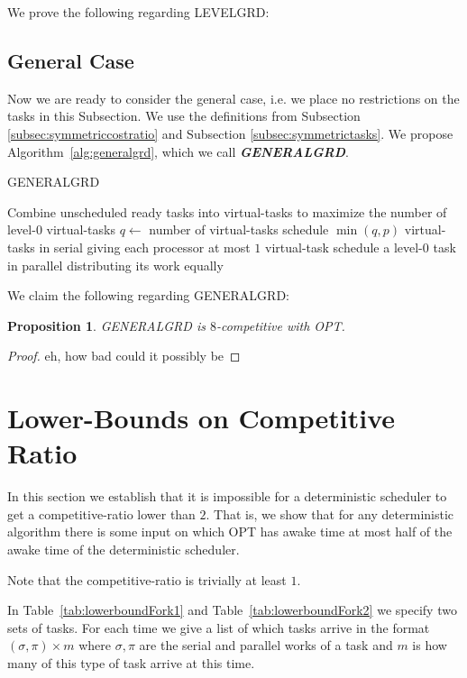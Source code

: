 \documentclass[twocolumn]{article}[10pt]
\newcommand{\defn}[1]{{\textit{\textbf{\boldmath #1}}}\xspace}
\newtheorem{proposition}{Proposition}
\begin{document}
We prove the following regarding LEVELGRD:


\subsection{General Case}
Now we are ready to consider the general case, i.e. we place no
restrictions on the tasks in this Subsection.
We use the definitions from Subsection
\ref{subsec:symmetriccostratio} and Subsection
\ref{subsec:symmetrictasks}.
We propose Algorithm~\ref{alg:generalgrd}, which we call
\defn{GENERALGRD}.

\begin{algorithm}
  \caption{GENERALGRD}
  \label{alg:generalgrd}
  \begin{algorithmic}
        \State Combine unscheduled ready tasks into virtual-tasks
        to maximize the number of level-$0$ virtual-tasks
        \State $q \gets $ number of virtual-tasks 
          \State schedule $\min(q, p)$ virtual-tasks in serial
          \State giving each processor at most $1$ virtual-task
        \Else
          \State schedule a level-$0$ task in parallel
          \State distributing its work equally 
        \EndIf
      \EndIf
    \EndWhile
  \end{algorithmic}
\end{algorithm}

We claim the following regarding GENERALGRD:
\begin{proposition}
  GENERALGRD is $8$-competitive with OPT.
\end{proposition}
\begin{proof}
  eh, how bad could it possibly be
\end{proof}

\section{Lower-Bounds on Competitive Ratio}

In this section we establish that it is impossible for a
deterministic scheduler to get a competitive-ratio lower than
$2$. That is, we show that for any deterministic algorithm there
is some input on which OPT has awake time at most half of the
awake time of the deterministic scheduler.

Note that the competitive-ratio is trivially at least $1$.

In Table~\ref{tab:lowerboundFork1} and
Table~\ref{tab:lowerboundFork2} we specify two sets of tasks.
For each time we give a list of which tasks arrive in the format
$(\sigma, \pi)\times m$ where $\sigma, \pi$ are the serial and
parallel works of a task and $m$ is how many of this type of task
arrive at this time.
\end{document}
